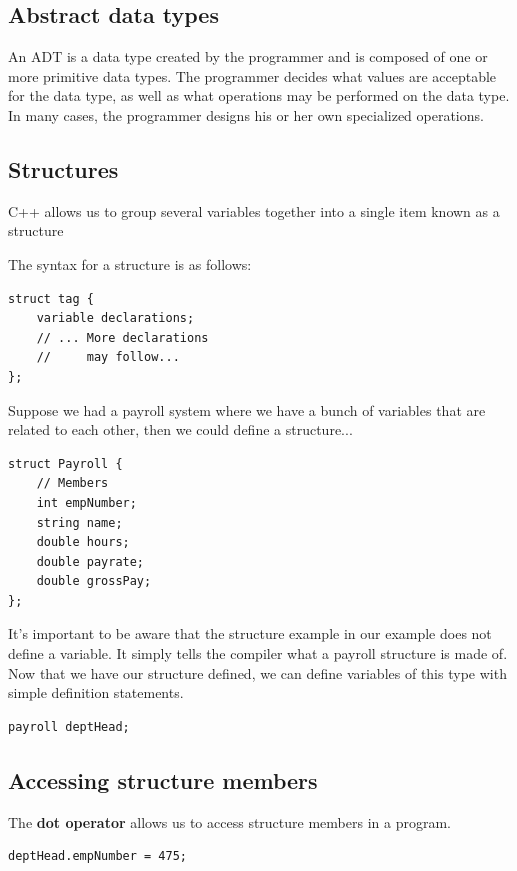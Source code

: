 \documentclass{report}
\begin{document}
	\bigbreak \noindent 
	\subsection{Abstract data types}
	\bigbreak \noindent 
	An ADT is a data type created by the programmer and is composed of one or more primitive data types. The programmer decides what values are acceptable for the data type, as well as what operations may be performed on the data type. In many cases, the programmer designs his or her own specialized operations.

	\bigbreak \noindent 
	\subsection{Structures}
	\bigbreak \noindent 
	\begin{concept}
	    C++ allows us to group several variables together into a single item known as a structure
	\end{concept}
	\bigbreak \noindent 
	The syntax for a structure is as follows:
	\bigbreak \noindent 
	\sepline
	\begin{verbatim}
struct tag {
    variable declarations;
    // ... More declarations 
    //     may follow...
};
	\end{verbatim}
	\sepline
	\bigbreak \noindent 
	Suppose we had a payroll system where we have a bunch of variables that are related to each other, then we could define a structure...
	\bigbreak \noindent 
	\sepline
	\begin{verbatim}
struct Payroll {
    // Members
    int empNumber;
    string name;
    double hours;
    double payrate;
    double grossPay;
};
	\end{verbatim}
	\sepline
	\bigbreak \noindent 

    \bigbreak \noindent 
	It's important to be aware that the structure example in our example does not define a variable. It simply tells the compiler what a payroll structure is made of.
	\bigbreak \noindent 
	Now that we have our structure defined, we can define variables of this type with simple definition statements.
	\bigbreak \noindent 
	\sepline
	\begin{verbatim}
payroll deptHead;
	\end{verbatim}
	\sepline

	\bigbreak \noindent 
	\subsection{Accessing structure members}
	\bigbreak \noindent 
	\begin{concept}
	    The \textbf{dot operator} allows us to access structure members in a program.
	\end{concept}
	\bigbreak \noindent 
	\sepline
	\begin{verbatim}
deptHead.empNumber = 475;
	\end{verbatim}
	\sepline
\end{document}
